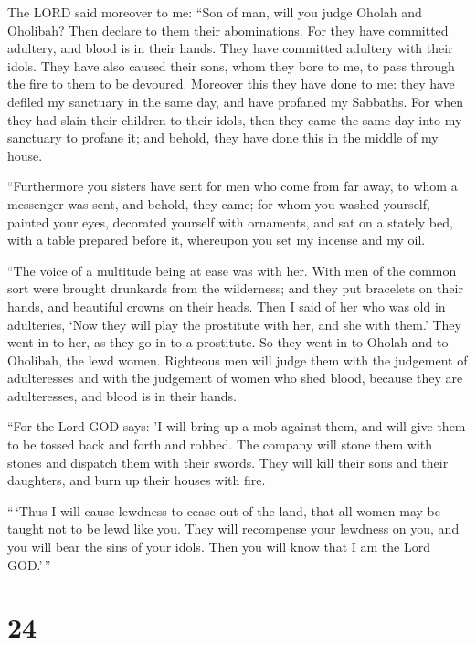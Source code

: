  The LORD said moreover to me: ``Son of man, will you
judge Oholah and Oholibah? Then declare to them their abominations.
 For they have committed adultery, and blood is in their
hands. They have committed adultery with their idols. They have also
caused their sons, whom they bore to me, to pass through the fire to
them to be devoured.  Moreover this they have done to me:
they have defiled my sanctuary in the same day, and have profaned my
Sabbaths.  For when they had slain their children to
their idols, then they came the same day into my sanctuary to profane
it; and behold, they have done this in the middle of my house.

 ``Furthermore you sisters have sent for men who come
from far away, to whom a messenger was sent, and behold, they came; for
whom you washed yourself, painted your eyes, decorated yourself with
ornaments,  and sat on a stately bed, with a table
prepared before it, whereupon you set my incense and my oil.

 ``The voice of a multitude being at ease was with her.
With men of the common sort were brought drunkards from the wilderness;
and they put bracelets on their hands, and beautiful crowns on their
heads.  Then I said of her who was old in adulteries,
`Now they will play the prostitute with her, and she with them.'
 They went in to her, as they go in to a prostitute. So
they went in to Oholah and to Oholibah, the lewd women. 
Righteous men will judge them with the judgement of adulteresses and
with the judgement of women who shed blood, because they are
adulteresses, and blood is in their hands.

 ``For the Lord GOD says: 'I will bring up a mob against
them, and will give them to be tossed back and forth and robbed.
 The company will stone them with stones and dispatch
them with their swords. They will kill their sons and their daughters,
and burn up their houses with fire.

 ``\,`Thus I will cause lewdness to cease out of the
land, that all women may be taught not to be lewd like you.
 They will recompense your lewdness on you, and you will
bear the sins of your idols. Then you will know that I am the Lord
GOD.'\,''

\hypertarget{section-22}{%
\section{24}\label{section-22}}


